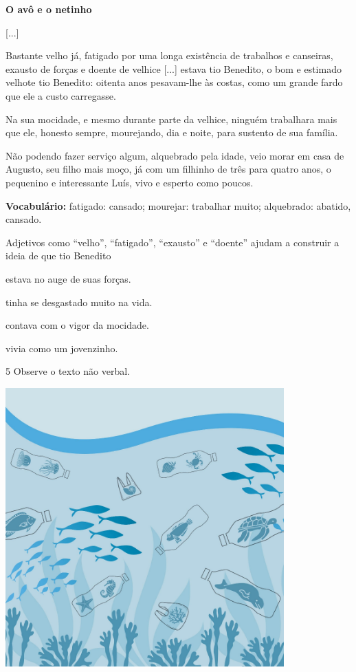 \begin{myquote}
\textbf{O avô e o netinho}

{[}...{]}

Bastante velho já, fatigado por uma longa existência de trabalhos e
canseiras, exausto de forças e doente de velhice {[}...{]} estava tio Benedito, o bom e estimado velhote tio
Benedito: oitenta anos pesavam-lhe às costas, como um grande fardo que
ele a custo carregasse.

Na sua mocidade, e mesmo durante parte da velhice, ninguém trabalhara
mais que ele, honesto sempre, mourejando, dia e noite, para sustento de
sua família.

Não podendo fazer serviço algum, alquebrado pela idade, veio morar em
casa de Augusto, seu filho mais moço, já com um filhinho de três para
quatro anos, o pequenino e interessante Luís, vivo e esperto como
poucos.


\textbf{Vocabulário:} fatigado: cansado; mourejar: trabalhar muito; alquebrado: abatido, cansado.
\end{myquote}


Adjetivos como ``velho'', ``fatigado'', ``exausto'' e ``doente'' ajudam a construir a ideia de que tio Benedito

\begin{escolha}
\item estava no auge de suas forças.

\item tinha se desgastado muito na vida.

\item contava com o vigor da mocidade.

\item vivia como um jovenzinho.
\end{escolha}

\num{5} Observe o texto não verbal.

\includegraphics[width=4.21875in,height=4.21875in]{./media/simulados/image4.png}

